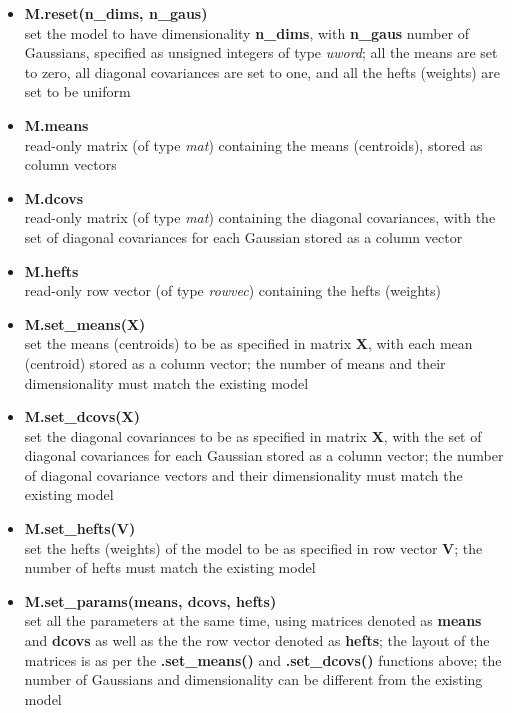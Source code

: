 \begin{small}
\begin{itemize}
\item
{\bf M.reset(n\_dims, n\_gaus)}\\
set the model to have dimensionality {\bf n\_dims}, with {\bf n\_gaus} number of Gaussians, specified as unsigned integers of type {\it uword};
all the means are set to zero, all diagonal covariances are set to one, and all the hefts (weights) are set to be uniform

\item
{\bf M.means}\\
read-only matrix (of type {\it mat}) containing the means (centroids), stored as column vectors

\item
{\bf M.dcovs}\\
read-only matrix (of type {\it mat}) containing the diagonal covariances, with the set of diagonal covariances for each Gaussian stored as a column vector

\item
{\bf M.hefts}\\
read-only row vector (of type {\it rowvec}) containing the hefts (weights)

\item
{\bf M.set\_means(X)}\\
set the means (centroids) to be as specified in matrix {\bf X}, with each mean (centroid) stored as a column vector;
the number of means and their dimensionality must match the existing model

\item
{\bf M.set\_dcovs(X)}\\
set the diagonal covariances to be as specified in matrix {\bf X}, with the set of diagonal covariances for each Gaussian stored as a column vector;
the number of diagonal covariance vectors and their dimensionality must match the existing model

\item
{\bf M.set\_hefts(V)}\\
set the hefts (weights) of the model to be as specified in row vector {\bf V};
the number of hefts must match the existing model

\item
{\bf M.set\_params(means, dcovs, hefts)}\\
set all the parameters at the same time, using matrices denoted as {\bf means} and {\bf dcovs} as well as the the row vector denoted as {\bf hefts};
the layout of the matrices is as per the {\bf .set\_means()} and {\bf .set\_dcovs()} functions above;
the number of Gaussians and dimensionality can be different from the existing model


\end{itemize}
\end{small}
